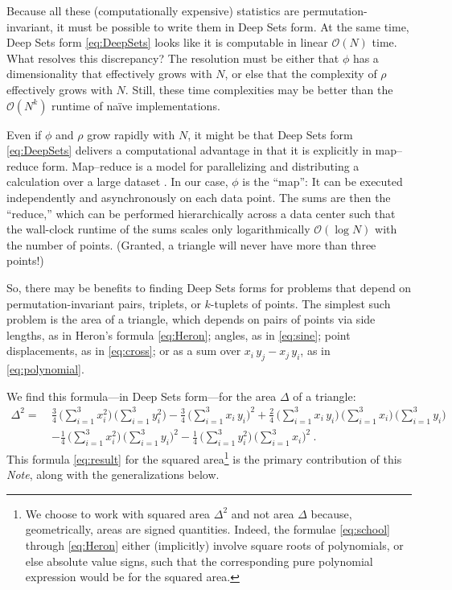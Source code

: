 \documentclass[10pt]{article}
\newcommand{\documentname}{\textsl{Note}}
\newcommand{\secbreak}{\bigskip{\centering\footnotesize%
\rotatebox[origin=c]{55}{$\triangle$}~~~%
\rotatebox[origin=c]{35}{$\triangle$}~~~%
\rotatebox[origin=c]{15}{$\triangle$}\par}\bigskip\noindent}
\begin{document}
Because all these (computationally expensive) statistics are permutation-invariant, it must be possible to write them in Deep Sets form.
At the same time, Deep Sets form \eqref{eq:DeepSets} looks like it is computable in linear $\mathcal{O}(N)$ time.
What resolves this discrepancy?
The resolution must be either that $\phi$ has a dimensionality that effectively grows with $N$, or else that the complexity of $\rho$ effectively grows with $N$.
Still, these time complexities may be better than the $\mathcal{O}(N^k)$ runtime of na\"ive implementations.

Even if $\phi$ and $\rho$ grow rapidly with $N$, it might be that Deep Sets form \eqref{eq:DeepSets} delivers a computational advantage in that it is explicitly in map--reduce form.
Map--reduce is a model for parallelizing and distributing a calculation over a large dataset \citep{DeanGhemawat2008,Lammel2008}.
In our case, $\phi$ is the ``map'':
It can be executed independently and asynchronously on each data point.
The sums are then the ``reduce,'' which can be performed hierarchically across a data center such that the wall-clock runtime of the sums scales only logarithmically $\mathcal{O}(\log N)$ with the number of points.
(Granted, a triangle will never have more than three points!)

So, there may be benefits to finding Deep Sets forms for problems that depend on permutation-invariant pairs, triplets, or $k$-tuplets of points.
The simplest such problem is the area of a triangle, 
which depends on pairs of points via
side lengths, as in Heron's formula \eqref{eq:Heron};
angles, as in \eqref{eq:sine};
point displacements, as in \eqref{eq:cross};
or as a sum over $x_i \, y_j - x_j \, y_i$, as in \eqref{eq:polynomial}.


\secbreak
We find this formula---in Deep Sets form---for the area $\Delta$ of a triangle:
\begin{align}
    \Delta^2 = \ &
    \frac{3}{4}
        \,\big( \sum_{i=1}^{3} x_i^2 \big)
        \,\big( \sum_{i=1}^{3} y_i^2 \big)
    - \frac{3}{4}
        \,\big( \sum_{i=1}^{3} x_i \, y_i \big)^2 
    + \frac{2}{4}
        \,\big( \sum_{i=1}^{3} x_i \, y_i \big)
        \,\big( \sum_{i=1}^{3} x_i \big)
        \,\big( \sum_{i=1}^{3} y_i \big)
    \nonumber\\ &
    - \frac{1}{4}
        \,\big( \sum_{i=1}^{3} x_i^2 \big)
        \,\big( \sum_{i=1}^{3} y_i \big)^2
    - \frac{1}{4}
        \,\big( \sum_{i=1}^{3} y_i^2 \big)
        \,\big( \sum_{i=1}^{3} x_i \big)^2
     ~.
\label{eq:result}
\end{align}
This formula \eqref{eq:result} for the squared area\footnote{%
    We choose to work with squared area $\Delta^2$ and not area $\Delta$ because, geometrically, areas are signed quantities.
    Indeed, the formulae \eqref{eq:school} through \eqref{eq:Heron} either (implicitly) involve square roots of polynomials, or else absolute value signs, such that the corresponding pure polynomial expression would be for the squared area.}
is the primary contribution of this \documentname, along with the generalizations below.
\end{document}
